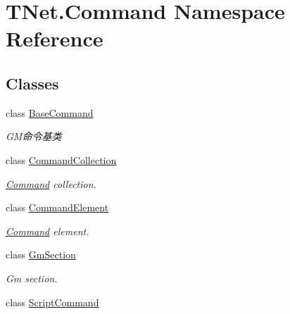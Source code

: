 \hypertarget{namespace_t_net_1_1_command}{}\section{T\+Net.\+Command Namespace Reference}
\label{namespace_t_net_1_1_command}
\subsection*{Classes}
\begin{DoxyCompactItemize}
\item 
class \mbox{\hyperlink{class_t_net_1_1_command_1_1_base_command}{Base\+Command}}
\begin{DoxyCompactList}\small\item\em G\+M命令基类 \end{DoxyCompactList}\item 
class \mbox{\hyperlink{class_t_net_1_1_command_1_1_command_collection}{Command\+Collection}}
\begin{DoxyCompactList}\small\item\em \mbox{\hyperlink{namespace_t_net_1_1_command}{Command}} collection. \end{DoxyCompactList}\item 
class \mbox{\hyperlink{class_t_net_1_1_command_1_1_command_element}{Command\+Element}}
\begin{DoxyCompactList}\small\item\em \mbox{\hyperlink{namespace_t_net_1_1_command}{Command}} element. \end{DoxyCompactList}\item 
class \mbox{\hyperlink{class_t_net_1_1_command_1_1_gm_section}{Gm\+Section}}
\begin{DoxyCompactList}\small\item\em Gm section. \end{DoxyCompactList}\item 
class \mbox{\hyperlink{class_t_net_1_1_command_1_1_script_command}{Script\+Command}}
\end{DoxyCompactItemize}
